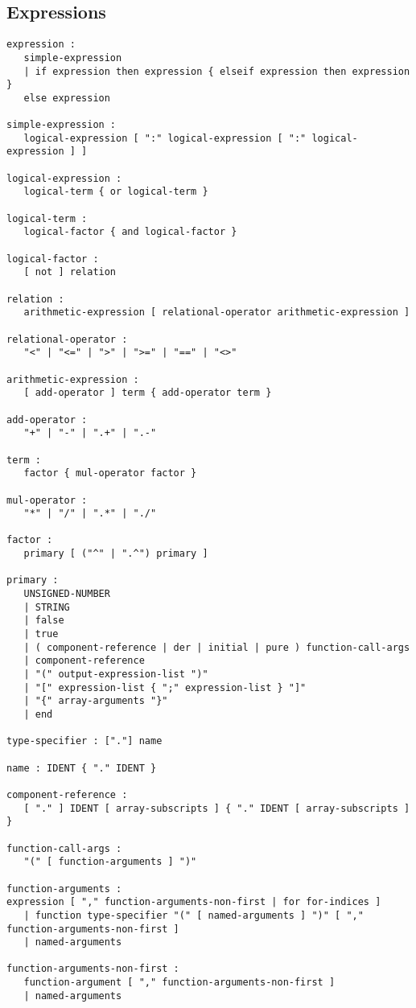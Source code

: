 \subsection{Expressions}
\begin{lstlisting}[language=grammar]
expression :
   simple-expression
   | if expression then expression { elseif expression then expression }
   else expression

simple-expression :
   logical-expression [ ":" logical-expression [ ":" logical-expression ] ]

logical-expression :
   logical-term { or logical-term }

logical-term :
   logical-factor { and logical-factor }

logical-factor :
   [ not ] relation

relation :
   arithmetic-expression [ relational-operator arithmetic-expression ]

relational-operator :
   "<" | "<=" | ">" | ">=" | "==" | "<>"

arithmetic-expression :
   [ add-operator ] term { add-operator term }

add-operator :
   "+" | "-" | ".+" | ".-"

term :
   factor { mul-operator factor }

mul-operator :
   "*" | "/" | ".*" | "./"

factor :
   primary [ ("^" | ".^") primary ]

primary :
   UNSIGNED-NUMBER
   | STRING
   | false
   | true
   | ( component-reference | der | initial | pure ) function-call-args
   | component-reference
   | "(" output-expression-list ")"
   | "[" expression-list { ";" expression-list } "]"
   | "{" array-arguments "}"
   | end

type-specifier : ["."] name

name : IDENT { "." IDENT }

component-reference :
   [ "." ] IDENT [ array-subscripts ] { "." IDENT [ array-subscripts ] }

function-call-args :
   "(" [ function-arguments ] ")"

function-arguments :
expression [ "," function-arguments-non-first | for for-indices ]
   | function type-specifier "(" [ named-arguments ] ")" [ "," function-arguments-non-first ]
   | named-arguments

function-arguments-non-first :
   function-argument [ "," function-arguments-non-first ]
   | named-arguments


\end{lstlisting}
